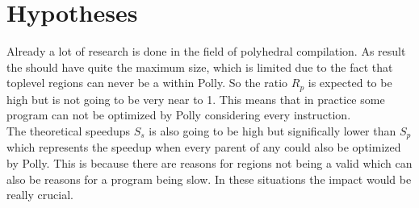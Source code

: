 \section{Hypotheses}
Already a lot of research is done in the field of polyhedral compilation.
As result the \scops should have quite the maximum size, which is limited due to the fact that toplevel regions can never be a \scop within Polly.
So the ratio \(R_p\) is expected to be high but is not going to be very near to 1.
This means that in practice some program can not be optimized by Polly considering every instruction.\\
The theoretical speedups \(S_s\) is also going to be high but significally lower than \(S_p\) which represents the speedup when every parent of any \scop could also be optimized by Polly.
This is because there are reasons for regions not being a valid \scop which can also be reasons for a program being slow.
In these situations the impact would be really crucial.


